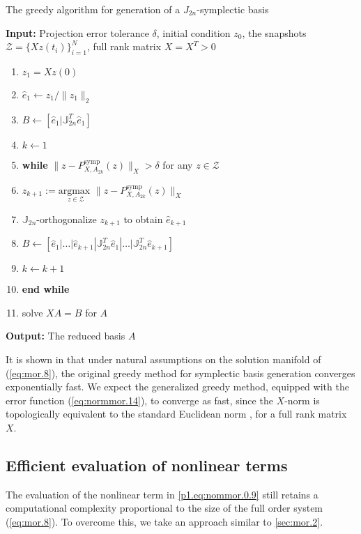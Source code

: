 \begin{algorithm} 
\caption{The greedy algorithm for generation of a $J_{2n}$-symplectic basis} \label{alg:2}
{\bf Input:} Projection error tolerance $\delta$, initial condition $ z_0$, the snapshots $\mathcal Z = \{Xz(t_i)\}_{i=1}^{N}$, full rank matrix $X=X^T>0$
\begin{enumerate}
\item $z_1 = Xz(0)$
\item $\hat e_1 \leftarrow z_1/ \| z_1 \|_2$
\item $B \leftarrow [\hat e_1| \mathbb J_{2n}^T \hat e_1]$
\item $k \leftarrow 1$
\item \textbf{while} $\| z - P^{\text{symp}}_{X,A_{2k}}(z)\|_X > \delta$ for any $z \in \mathcal Z$
\item \hspace{0.5cm} $z_{k+1} := \underset{z\in \mathcal Z}{\text{argmax }} \| z - P^{\text{symp}}_{X,A_{2k}}(z)\|_X$
\item \hspace{0.5cm} $\mathbb J_{2n}$-orthogonalize $z_{k+1}$ to obtain $\hat e_{k+1}$
\item \hspace{0.5cm} $B \leftarrow [\hat e_1|\dots |\hat e_{k+1} | \mathbb J_{2n}^T \hat e_1|\dots| \mathbb J_{2n}^T  \hat e_{k+1}]$
\item \hspace{0.5cm} $k \leftarrow k+1$
\item \textbf{end while}
\item solve $X A = B$ for $A$
\end{enumerate}
\vspace{0.5cm}
{\bf Output:} The reduced basis $A$
\end{algorithm}
It is shown in \cite{doi:10.1137/17M1111991} that under natural assumptions on the solution manifold of (\ref{eq:mor.8}), the original greedy method for symplectic basis generation converges exponentially fast. We expect the generalized greedy method, equipped with the error function (\ref{eq:normmor.14}), to converge as fast, since the $X$-norm is topologically equivalent to the standard Euclidean norm \cite{friedman1970foundations}, for a full rank matrix $X$.

\subsection{Efficient evaluation of nonlinear terms} \label{sec:normmor.3}
The evaluation of the nonlinear term in \eqref{p1.eq:nommor.0.9} still retains a computational complexity proportional to the size of the full order system (\ref{eq:mor.8}). To overcome this, we take an approach similar to \cref{sec:mor.2}. 


